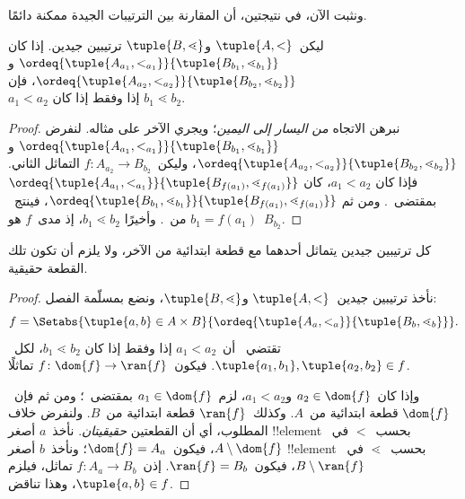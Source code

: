 \documentclass[../../../include/open-logic-section]{subfiles}
\begin{document}
ونثبت الآن، في نتيجتين، أن المقارنة بين الترتيبات الجيدة ممكنة دائمًا.

\begin{lem}
ليكن~$\tuple{A, <}$ و$\tuple{B, \lessdot}$ ترتيبين جيدين. إذا كان
$\ordeq{\tuple{A_{a_1}, <_{a_1}}}{\tuple{B_{b_1}, \lessdot_{b_1}}}$
و$\ordeq{\tuple{A_{{a_2}}, <_{a_2}}}{\tuple{B_{{b_2}}, \lessdot_{b_2}}}$،
فإن~${a_1} < {a_2} \text{ إذا وفقط إذا كان } {b_1} \lessdot {b_2}$.
\end{lem}

\begin{proof}
نبرهن الاتجاه \emph{من اليسار إلى اليمين}؛ ويجري الآخر على مثاله.
لنفرض
$\ordeq{\tuple{A_{a_1}, <_{a_1}}}{\tuple{B_{b_1}, \lessdot_{b_1}}}$
و$\ordeq{\tuple{A_{{a_2}}, <_{a_2}}}{\tuple{B_{{b_2}}, \lessdot_{b_2}}}$،
وليكن~$f \colon A_{{a_2}} \to B_{{b_2}}$ التماثل الثاني. فإذا كان
${a_1} < {a_2}$، كان
$\ordeq{\tuple{A_{a_1}, <_{a_1}}}{\tuple{B_{f({a_1})}, \lessdot_{f({a_1})}}}$
بمقتضى~. ومن ثم
$\ordeq{\tuple{B_{b_1}, \lessdot_{b_1}}}{\tuple{B_{f({a_1})}, \lessdot_{f({a_1})}}}$،
فينتج~${b_1} = f({a_1})$ من~. وأخيرًا
${b_1} \lessdot {b_2}$، إذ مدى~$f$ هو~$B_{{b_2}}$.
\end{proof}

\begin{thm}
كل ترتيبين جيدين يتماثل أحدهما مع قطعة ابتدائية من الآخر، ولا يلزم
أن تكون تلك القطعة حقيقية.
\end{thm}

\begin{proof}
نأخذ ترتيبين جيدين~$\tuple{A, <}$ و$\tuple{B, \lessdot}$، ونضع
بمسلّمة الفصل:
\[
f = \Setabs{\tuple{a, b} \in A \times B}{
\ordeq{\tuple{A_a, <_a}}{\tuple{B_b, \lessdot_b}}}.
\]
تقتضي~ أن~$a_1 < a_2$ إذا وفقط إذا كان
$b_1 \lessdot b_2$، لكل~$\tuple{a_1, b_1}, \tuple{a_2, b_2} \in f$.
فيكون~$f \colon \dom{f} \to \ran{f}$ تماثلًا.

وإذا كان~$a_2 \in \dom{f}$ و$a_1 < a_2$، لزم~$a_1 \in \dom{f}$
بمقتضى~؛ ومن ثم فإن~$\dom{f}$ قطعة
ابتدائية من~$A$. وكذلك~$\ran{f}$ قطعة ابتدائية من~$B$. ولنفرض
خلاف المطلوب، أي أن القطعتين \emph{حقيقيتان}. نأخذ~$a$ أصغر
!!{element} بحسب~$<$ في~$A \setminus \dom{f}$، فيكون~$\dom{f} = A_a$؛
ونأخذ~$b$ أصغر !!{element} بحسب~$\lessdot$ في~$B \setminus \ran{f}$،
فيكون~$\ran{f} = B_b$. إذن~$f \colon A_a \to B_b$ تماثل، فيلزم
$\tuple{a, b} \in f$، وهذا تناقض.
\end{proof}
\end{document}
